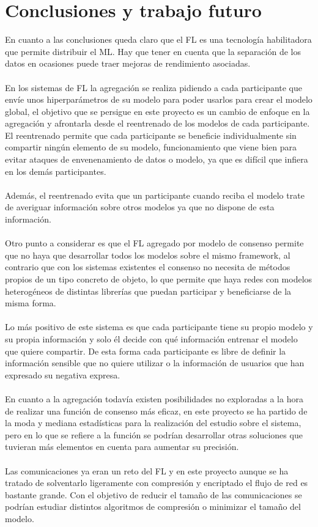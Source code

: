 \chapter{Conclusiones y trabajo futuro}
\thispagestyle{fancy}

En cuanto a las conclusiones queda claro que el FL es una tecnología habilitadora que permite distribuir el ML. Hay que tener en cuenta que la separación de los datos en ocasiones puede traer mejoras de rendimiento asociadas.
\\\\
En los sistemas de FL la agregación se realiza pidiendo a cada participante que envíe unos hiperparámetros de su modelo para poder usarlos para crear el modelo global, el objetivo que se persigue en este proyecto es un cambio de enfoque en la agregación y afrontarla desde el reentrenado de los modelos de cada participante. El reentrenado permite que cada participante se beneficie individualmente sin compartir ningún elemento de su modelo, funcionamiento que viene bien para evitar ataques de envenenamiento de datos o modelo, ya que es difícil que infiera en los demás participantes.
\\\\
Además, el reentrenado evita que un participante cuando reciba el modelo trate de averiguar información sobre otros modelos ya que no dispone de esta información. 
\\\\
Otro punto a considerar es que el FL agregado por modelo de consenso permite que no haya que desarrollar todos los modelos sobre el mismo framework, al contrario que con los sistemas existentes el consenso no necesita de métodos propios de un tipo concreto de objeto, lo que permite que haya redes con modelos heterogéneos de distintas librerías que puedan participar y beneficiarse de la misma forma.
\\\\
Lo más positivo de este sistema es que cada participante tiene su propio modelo y su propia información y solo él decide con qué información entrenar el modelo que quiere compartir. De esta forma cada participante es libre de definir la información sensible que no quiere utilizar o la información de usuarios que han expresado su negativa expresa. 
\\\\
En cuanto a la agregación todavía existen posibilidades no exploradas a la hora de realizar una función de consenso más eficaz, en este proyecto se ha partido de la moda y mediana estadísticas para la realización del estudio sobre el sistema, pero en lo que se refiere a la función se podrían desarrollar otras soluciones que tuvieran más elementos en cuenta para aumentar su precisión.
\\\\
Las comunicaciones ya eran un reto del FL y en este proyecto aunque se ha tratado de solventarlo ligeramente con compresión y encriptado el flujo de red es bastante grande. Con el objetivo de reducir el tamaño de las comunicaciones se podrían estudiar distintos algoritmos de compresión o minimizar el tamaño del modelo.
